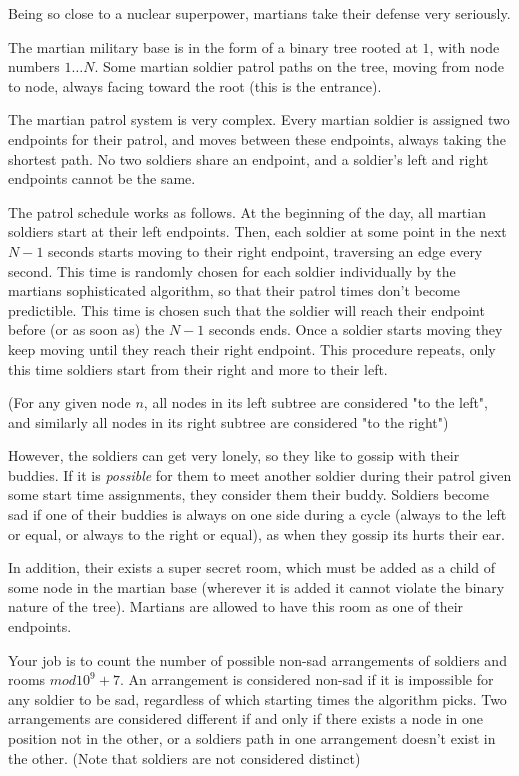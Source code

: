 
Being so close to a nuclear superpower, martians take their defense very seriously.

The martian military base is in the form of a binary tree rooted at $1$, with node numbers $1 \dots N$. Some martian soldier patrol paths on the tree, moving from node to node, always facing toward the root (this is the entrance). 

The martian patrol system is very complex. Every martian soldier is assigned two endpoints for their patrol, and moves between these endpoints, always taking the shortest path. No two soldiers share an endpoint, and a soldier's left and right endpoints cannot be the same.

The patrol schedule works as follows. At the beginning of the day, all martian soldiers start at their left endpoints. Then, each soldier at some point in the next $N-1$ seconds starts moving to their right endpoint, traversing an edge every second. This time is randomly chosen for each soldier individually by the martians sophisticated algorithm, so that their patrol times don't become predictible. This time is chosen such that the soldier will reach their endpoint before (or as soon as) the $N-1$ seconds ends. Once a soldier starts moving they keep moving until they reach their right endpoint. This procedure repeats, only this time soldiers start from their right and more to their left.

(For any given node $n$, all nodes in its left subtree are considered "to the left", and similarly all nodes in its right subtree are considered "to the right")

However, the soldiers can get very lonely, so they like to gossip with their buddies. If it is \emph{possible} for them to meet another soldier during their patrol given some start time assignments, they consider them their buddy. Soldiers become sad if one of their buddies is always on one side during a cycle (always to the left or equal, or always to the right or equal), as when they gossip its hurts their ear. 

In addition, their exists a super secret room, which must be added as a child of some node in the martian base (wherever it is added it cannot violate the binary nature of the tree). Martians are allowed to have this room as one of their endpoints.

Your job is to count the number of possible non-sad arrangements of soldiers and rooms $mod 10^9 + 7$. An arrangement is considered non-sad if it is impossible for any soldier to be sad, regardless of which starting times the algorithm picks. Two arrangements are considered different if and only if there exists a node in one position not in the other, or a soldiers path in one arrangement doesn't exist in the other. (Note that soldiers are not considered distinct)

